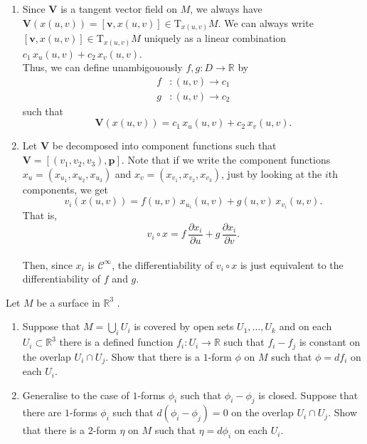 \documentclass[12 pt, letterpaper]{hmcpset}
\begin{document}
\begin{solution}
	\begin{enumerate}
		\item
			Since $\mathbf{V}$ is a tangent vector field on $M$, we always have $\mathbf{V}(x(u, v)) = [\mathbf{v}, x(u, v)] \in \mathrm{T}_{x(u, v)} M$. We can always write $[\mathbf{v}, x(u, v)] \in \mathrm{T}_{x(u, v)} M$ uniquely as a linear combination $c_{1} \, x_{u}(u, v) + c_{2} \, x_{v}(u, v)$. \\

			Thus, we can define unambigouously $f, g : D \to \mathbb{R}$ by
			\[
				\begin{split}
					f & : (u, v) \to c_1  \\
					g & : (u, v) \to c_{2}
				\end{split}
			\]
			such that
			\[
				\mathbf{V}(x(u, v)) = c_{1} \, x_{u}(u, v) + c_2 \, x_{v}(u, v).
			\]
		\item
			Let $\mathbf{V}$ be decomposed into component functions such that $\mathbf{V} = [(v_{1}, v_{2}, v_{3}), \mathbf{p}]$. Note that if we write the component functions $x_{u} = (x_{u_{1}}, x_{u_{2}}, x_{u_{3}})$ and $x_{v} = (x_{v_{1}}, x_{v_{2}}, x_{v_{3}})$, just by looking at the $i$th components, we get
			\[
				v_{i}(x(u, v)) = f(u, v) \, x_{u_{i}}(u, v) + g(u, v) \, x_{v_i}(u, v).
			\]
			That is,
			\[
				v_{i} \circ x = f \, \frac{\partial x_{i}}{\partial u} + g \, \frac{\partial x_{i}}{\partial v}.
			\] \\
			Then, since $x_{i}$ is $\mathcal{C}^{\infty}$, the differentiability of $v_{i} \circ x$ is just equivalent to the differentiability of $f$ and $g$.
	\end{enumerate}
\end{solution}

\pagebreak

\begin{problem}[Problem 4.]
	Let $M$  be a surface in $\mathbb{R}^{3}$ .
	\begin{enumerate}
		\item Suppose that $M = \bigcup_{i} U_{i}$ is covered by open sets $U_{1}, \dots, U_{k}$ and on each $U_{i} \subset \mathbb{R}^{3}$ there is a defined function $f_{i} : U_{i} \to \mathbb{R}$ such that $f_{i} - f_{j}$ is constant on the overlap $U_{i} \cap U_{j}$. Show that there is a $1$-form $\phi$ on $M$ such that $\phi = df_{i}$ on each $U_{i}$.
		\item Generalise to the case of $1$-forms $\phi_{i}$ such that $\phi_{i} - \phi_{j}$ is closed. Suppose that there are $1$-forms $\phi_{i}$ such that $d(\phi_{i} - \phi_{j}) = 0$ on the overlap $U_{i} \cap U_{j}$. Show that there is a $2$-form $\eta$ on $M$ such that $\eta = d\phi_{i}$ on each $U_{i}$.
	\end{enumerate}
\end{problem}
\end{document}

